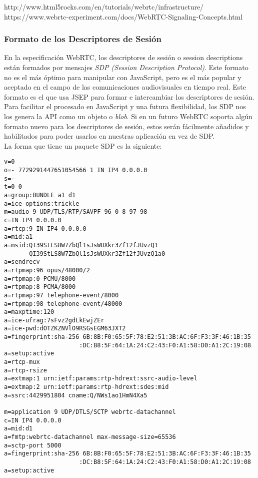 http://www.html5rocks.com/en/tutorials/webrtc/infrastructure/
https://www.webrtc-experiment.com/docs/WebRTC-Signaling-Concepts.html

\subsubsection{Formato de los Descriptores de Sesión}

En la especificación WebRTC, los descriptores de sesión o session descriptions están formados por mensajes \textit{SDP (Session Description Protocol)}. Este formato no es el más óptimo para manipular con JavaScript, pero es el más popular y aceptado en el campo de las comunicaciones audiovisuales en tiempo real. Este formato es el que usa JSEP para formar e intercambiar los descriptores de sesión.\\

Para facilitar el procesado en JavaScript y una futura flexibilidad, los SDP nos los genera la API como un objeto o \textit{blob}. Si en un futuro WebRTC soporta algún formato nuevo para los descriptores de sesión, estos serán fácilmente añadidos y habilitados para poder usarlos en nuestras aplicación en vez de SDP.\\

La forma que tiene un paquete SDP es la siguiente:

\begin{lstlisting}[caption=Ejemplo paquete SDP]
v=0
o=- 7729291447651054566 1 IN IP4 0.0.0.0
s=-
t=0 0
a=group:BUNDLE a1 d1
a=ice-options:trickle
m=audio 9 UDP/TLS/RTP/SAVPF 96 0 8 97 98
c=IN IP4 0.0.0.0
a=rtcp:9 IN IP4 0.0.0.0
a=mid:a1
a=msid:QI39StLS8W7ZbQl1sJsWUXkr3Zf12fJUvzQ1
       QI39StLS8W7ZbQl1sJsWUXkr3Zf12fJUvzQ1a0
a=sendrecv
a=rtpmap:96 opus/48000/2
a=rtpmap:0 PCMU/8000
a=rtpmap:8 PCMA/8000
a=rtpmap:97 telephone-event/8000
a=rtpmap:98 telephone-event/48000
a=maxptime:120
a=ice-ufrag:7sFvz2gdLkEwjZEr
a=ice-pwd:dOTZKZNVlO9RSGsEGM63JXT2
a=fingerprint:sha-256 6B:8B:F0:65:5F:78:E2:51:3B:AC:6F:F3:3F:46:1B:35
                     :DC:B8:5F:64:1A:24:C2:43:F0:A1:58:D0:A1:2C:19:08
a=setup:active
a=rtcp-mux
a=rtcp-rsize
a=extmap:1 urn:ietf:params:rtp-hdrext:ssrc-audio-level
a=extmap:2 urn:ietf:params:rtp-hdrext:sdes:mid
a=ssrc:4429951804 cname:Q/NWs1ao1HmN4Xa5

m=application 9 UDP/DTLS/SCTP webrtc-datachannel
c=IN IP4 0.0.0.0
a=mid:d1
a=fmtp:webrtc-datachannel max-message-size=65536
a=sctp-port 5000
a=fingerprint:sha-256 6B:8B:F0:65:5F:78:E2:51:3B:AC:6F:F3:3F:46:1B:35
                     :DC:B8:5F:64:1A:24:C2:43:F0:A1:58:D0:A1:2C:19:08
a=setup:active
\end{lstlisting}


